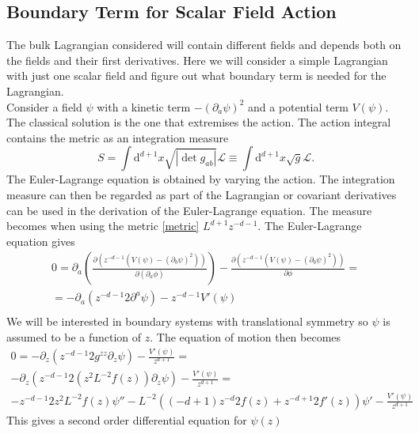 \documentclass[12pt]{report}
\renewcommand{\d}{\ensuremath{\mathrm{d}}}
\renewcommand{\L}{\ensuremath{\mathcal{L}}}
\newcommand{\At}{\ensuremath{{\phi}}}
\begin{document}
\begin{appendices}
\chapter{Boundary Term for Scalar Field Action \label{a:bound}}
The bulk Lagrangian considered will contain different fields and depends both on the fields and their first derivatives. Here we will consider a simple Lagrangian with just one scalar field and figure out what boundary term is needed for the Lagrangian.\\

Consider a field $\psi$ with a kinetic term $-(\partial_a\psi)^2$ and a potential term $V(\psi)$. The classical solution is the one that extremises the action. The action integral contains the metric as an integration measure
\begin{equation}
 S=\int\d^{d+1} x\sqrt{|\det g_{ab}|}\L\equiv\int\d^{d+1} x\sqrt{g}\L.
\end{equation}
The Euler-Lagrange equation is obtained by varying the action. The integration measure can then be regarded as part of the Lagrangian or covariant derivatives can be used in the derivation of the Euler-Lagrange equation. The measure becomes when using the metric \eqref{metric} $L^{d+1}z^{-d-1}$. The Euler-Lagrange equation gives
\begin{equation}
\begin{split}
 0=\partial_a\left(\frac{\partial (z^{-d-1}(V(\psi)-(\partial_b\psi)^2)) }{\partial(\partial_a\At)}\right)-\frac{\partial  (z^{-d-1}(V(\psi)-(\partial_b\psi)^2) )}{\partial\At}=\\
 =-\partial_a\left(z^{-d-1}2\partial^a\psi\right)-z^{-d-1}V'(\psi)\\
\end{split}
\end{equation}
We will be interested in boundary systems with translational symmetry so $\psi$ is assumed to be a function of $z$. The equation of motion then becomes
\begin{equation}
\begin{split}
0=-\partial_z\left(z^{-d-1}2g^{zz}\partial_z\psi\right)  -\frac{V'(\psi)}{z^{d+1}}=\\
-\partial_z\left(z^{-d-1}2(z^2L^{-2}f(z))\partial_z\psi\right)  -\frac{V'(\psi)}{z^{d+1}}=\\
-z^{-d-1}2z^2L^{-2}f(z)\psi''-L^{-2}\left((-d+1)z^{-d}2f(z) + z^{-d+1}2f'(z)\right)\psi' -\frac{V'(\psi)}{z^{d+1}}
\end{split}
\end{equation}
This gives a second order differential equation for $\psi(z)$

\end{appendices}
\end{document}

